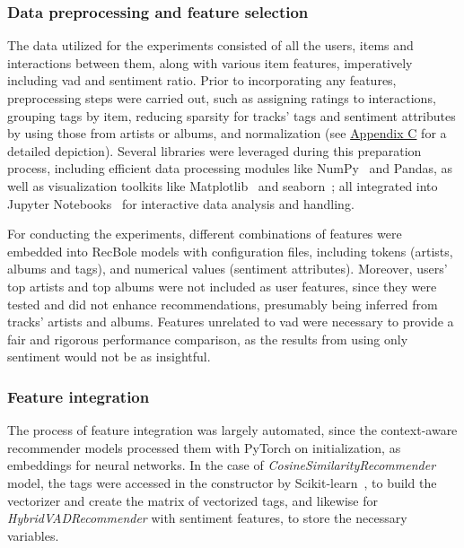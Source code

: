\subsubsection{Data preprocessing and feature selection}

The data utilized for the experiments consisted of all the users, items and interactions between them, along with various item features, imperatively including \acs{vad} and sentiment ratio. Prior to incorporating any features, preprocessing steps were carried out, such as assigning ratings to interactions, grouping tags by item, reducing sparsity for tracks' tags and sentiment attributes by using those from artists or albums, and normalization (see \hyperref[AP:DATAPROC]{Appendix C} for a detailed depiction). Several libraries were leveraged during this preparation process, including efficient data processing modules like NumPy~\cite{NUMPY} and Pandas, as well as visualization toolkits like Matplotlib~\cite{MATPLOTLIB} and seaborn~\cite{SEABORN}; all integrated into Jupyter Notebooks~\cite{JUPYTER} for interactive data analysis and handling. 

For conducting the experiments, different combinations of features were embedded into RecBole models with configuration files, including tokens (artists, albums and tags), and numerical values (sentiment attributes). Moreover, users' top artists and top albums were not included as user features, since they were tested and did not enhance recommendations, presumably being inferred from tracks' artists and albums. Features unrelated to \acs{vad} were necessary to provide a fair and rigorous performance comparison, as the results from using only sentiment would not be as insightful.

\subsubsection{Feature integration}

The process of feature integration was largely automated, since the context-aware recommender models processed them with PyTorch on initialization, as embeddings for neural networks. In the case of \emph{CosineSimilarityRecommender} model, the tags were accessed in the constructor by Scikit-learn~\cite{SKLEARN}, to build the vectorizer and create the matrix of vectorized tags, and likewise for \emph{HybridVADRecommender} with sentiment features, to store the necessary variables.